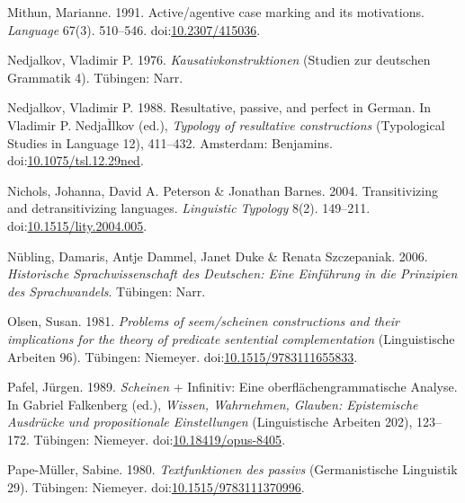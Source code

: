 \leavevmode{}%
Mithun, Marianne. 1991. Active/agentive case marking and its
motivations. \emph{Language} 67(3). 510--546.
doi:\href{https://doi.org/10.2307/415036}{10.2307/415036}.

\leavevmode{}%
Nedjalkov, Vladimir P. 1976. \emph{Kausativkonstruktionen} (Studien
{zur} {deutschen} Grammatik 4). Tübingen: Narr.

\leavevmode{}%
Nedjalkov, Vladimir P. 1988. Resultative, passive, and perfect in
{German}. In Vladimir P. NedjaÌlkov (ed.), \emph{Typology of resultative
constructions} (Typological Studies in Language 12), 411--432.
Amsterdam: Benjamins.
doi:\href{https://doi.org/10.1075/tsl.12.29ned}{10.1075/tsl.12.29ned}.

\leavevmode{}%
Nichols, Johanna, David A. Peterson \& Jonathan Barnes. 2004.
Transitivizing and detransitivizing languages. \emph{Linguistic
Typology} 8(2). 149--211.
doi:\href{https://doi.org/10.1515/lity.2004.005}{10.1515/lity.2004.005}.

\leavevmode{}%
Nübling, Damaris, Antje Dammel, Janet Duke \& Renata Szczepaniak. 2006.
\emph{Historische {Sprachwissenschaft} des {Deutschen}: Eine
{Einführung} in die {Prinzipien} des {Sprachwandel}s}. Tübingen: Narr.

\leavevmode{}%
Olsen, Susan. 1981. \emph{Problems of {seem/scheinen} constructions and
their implications for the theory of predicate sentential
complementation} (Linguistische Arbeiten 96). Tübingen: Niemeyer.
doi:\href{https://doi.org/10.1515/9783111655833}{10.1515/9783111655833}.

\leavevmode{}%
Pafel, Jürgen. 1989. \emph{Scheinen} + {Infinitiv}: Eine
oberflächengrammatische {Analyse}. In Gabriel Falkenberg (ed.),
\emph{{Wissen, Wahrnehmen, Glauben}: Epistemische {Ausdrücke} und
propositionale {Einstellungen}} (Linguistische Arbeiten 202), 123--172.
Tübingen: Niemeyer.
doi:\href{https://doi.org/10.18419/opus-8405}{10.18419/opus-8405}.

\leavevmode{}%
Pape-Müller, Sabine. 1980. \emph{Textfunktionen des passivs}
(Germanistische Linguistik 29). Tübingen: Niemeyer.
doi:\href{https://doi.org/10.1515/9783111370996}{10.1515/9783111370996}.

